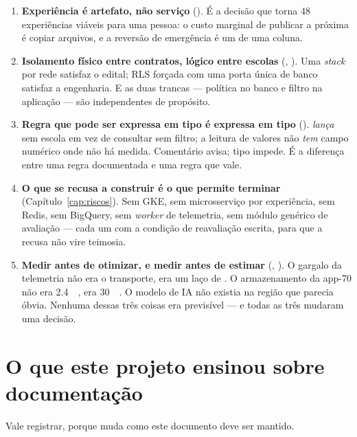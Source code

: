 \begin{enumerate}
  \item \textbf{Experiência é artefato, não serviço} (). É a decisão
    que torna 48 experiências viáveis para uma pessoa: o custo marginal de
    publicar a próxima é copiar arquivos, e a reversão de emergência é um
     de uma coluna.

  \item \textbf{Isolamento físico entre contratos, lógico entre escolas}
    (, ). Uma \emph{stack} por rede satisfaz o edital;
    RLS forçada com uma porta única de banco satisfaz a engenharia. E as duas
    trancas --- política no banco e filtro na aplicação --- são independentes de
    propósito.

  \item \textbf{Regra que pode ser expressa em tipo é expressa em tipo}
    ().  \emph{lança} sem escola em vez de consultar
    sem filtro; a leitura de valores não \emph{tem} campo numérico onde não há
    medida. Comentário avisa; tipo impede. É a diferença entre uma regra
    documentada e uma regra que vale.

  \item \textbf{O que se recusa a construir é o que permite terminar}
    (Capítulo~\ref{cap:riscos}). Sem GKE, sem microsserviço por experiência, sem
    Redis, sem BigQuery, sem \emph{worker} de telemetria, sem módulo genérico de
    avaliação --- cada um com a condição de reavaliação escrita, para que a recusa
    não vire teimosia.

  \item \textbf{Medir antes de otimizar, e medir antes de estimar}
    (, ). O gargalo da telemetria não era o transporte,
    era um laço de . O armazenamento da app-70 não era
    \SI{2.4}{\giga\byte}, era \SI{30}{\mega\byte}. O modelo de IA não existia na
    região que parecia óbvia. Nenhuma dessas três coisas era previsível --- e
    todas as três mudaram uma decisão.
\end{enumerate}

\section{O que este projeto ensinou sobre documentação}

Vale registrar, porque muda como este documento deve ser mantido.

